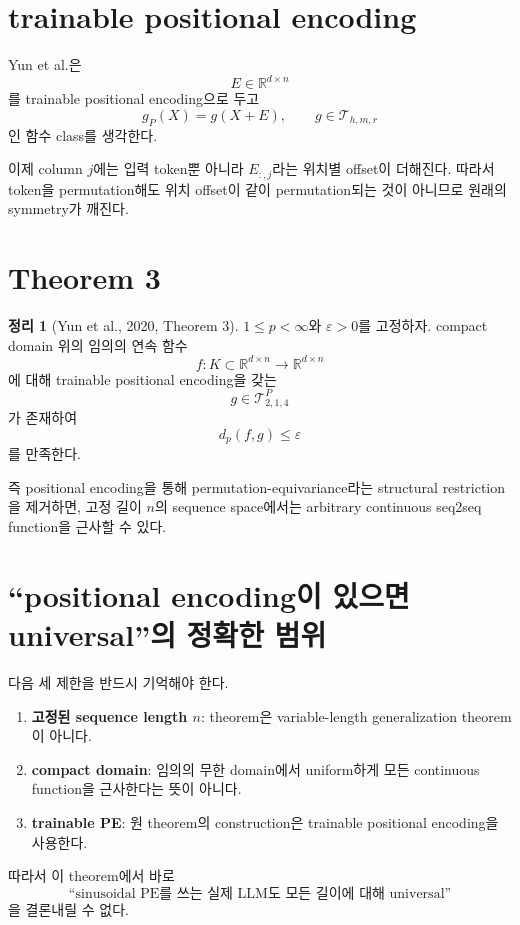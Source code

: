 \documentclass[11pt,a4paper,oneside,openany]{memoir}
\newcommand{\R}{\mathbb{R}}
\theoremstyle{definition}
\newtheorem{theorem}{정리}[chapter]
\begin{document}
\section{trainable positional encoding}

Yun et al.은
\[
E\in\R^{d\times n}
\]
를 trainable positional encoding으로 두고
\[
g_P(X)=g(X+E),
\qquad
g\in\mathcal T_{h,m,r}
\]
인 함수 class를 생각한다.

이제 column $j$에는 입력 token뿐 아니라 $E_{:,j}$라는 위치별 offset이 더해진다.
따라서 token을 permutation해도 위치 offset이 같이 permutation되는 것이 아니므로 원래의 symmetry가 깨진다.

\section{Theorem 3}

\begin{theorem}[Yun et al., 2020, Theorem 3]
$1\le p<\infty$와 $\varepsilon>0$를 고정하자.
compact domain 위의 임의의 연속 함수
\[
f:K\subset\R^{d\times n}\to\R^{d\times n}
\]
에 대해 trainable positional encoding을 갖는
\[
g\in\mathcal T^{P}_{2,1,4}
\]
가 존재하여
\[
d_p(f,g)\le\varepsilon
\]
를 만족한다.
\end{theorem}

즉 positional encoding을 통해 permutation-equivariance라는 structural restriction을 제거하면,
고정 길이 $n$의 sequence space에서는 arbitrary continuous seq2seq function을 근사할 수 있다.

\section{``positional encoding이 있으면 universal''의 정확한 범위}

다음 세 제한을 반드시 기억해야 한다.

\begin{enumerate}
  \item \textbf{고정된 sequence length $n$}: theorem은 variable-length generalization theorem이 아니다.
  \item \textbf{compact domain}: 임의의 무한 domain에서 uniform하게 모든 continuous function을 근사한다는 뜻이 아니다.
  \item \textbf{trainable PE}: 원 theorem의 construction은 trainable positional encoding을 사용한다.
\end{enumerate}

따라서 이 theorem에서 바로
\[
\text{``sinusoidal PE를 쓰는 실제 LLM도 모든 길이에 대해 universal''}
\]
을 결론내릴 수 없다.
\end{document}
